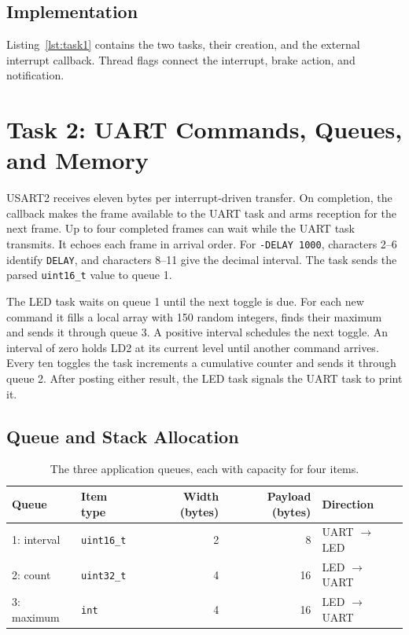\documentclass[11pt,a4paper]{article}
\begin{document}
\clearpage
\subsection{Implementation}
Listing~\ref{lst:task1} contains the two tasks, their creation, and the external interrupt callback. Thread flags connect the interrupt, brake action, and notification.


\clearpage
\section{Task 2: UART Commands, Queues, and Memory}
USART2 receives eleven bytes per interrupt-driven transfer. On completion, the callback makes the frame available to the UART task and arms reception for the next frame. Up to four completed frames can wait while the UART task transmits. It echoes each frame in arrival order. For \texttt{-DELAY 1000}, characters 2--6 identify \texttt{DELAY}, and characters 8--11 give the decimal interval. The task sends the parsed \texttt{uint16\_t} value to queue 1.

The LED task waits on queue 1 until the next toggle is due. For each new command it fills a local array with 150 random integers, finds their maximum and sends it through queue 3. A positive interval schedules the next toggle. An interval of zero holds LD2 at its current level until another command arrives. Every ten toggles the task increments a cumulative counter and sends it through queue 2. After posting either result, the LED task signals the UART task to print it.

\subsection{Queue and Stack Allocation}
\begin{table}[H]
\centering
\caption{The three application queues, each with capacity for four items.}
\label{tab:queues}
\begin{tabular}{@{}llrrl@{}}
\toprule
Queue & Item type & Width (bytes) & Payload (bytes) & Direction \\
\midrule
1: interval & \texttt{uint16\_t} & 2 & 8 & UART $\rightarrow$ LED \\
2: count & \texttt{uint32\_t} & 4 & 16 & LED $\rightarrow$ UART \\
3: maximum & \texttt{int} & 4 & 16 & LED $\rightarrow$ UART \\
\bottomrule
\end{tabular}
\end{table}
\end{document}
